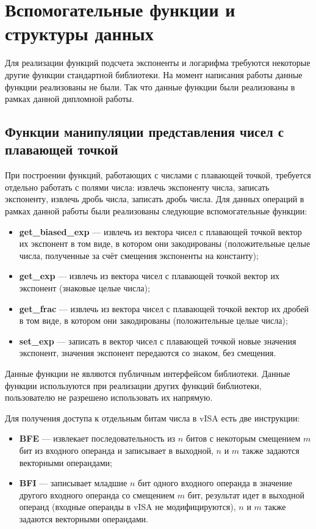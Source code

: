 

\chapter{Вспомогательные функции и структуры данных}

Для реализации функций подсчета экспоненты и логарифма требуются некоторые другие функции стандартной библиотеки.
На момент написания работы данные функции реализованы не были.
Так что данные функции были реализованы в рамках данной дипломной работы.

\section{Функции манипуляции представления чисел с плавающей точкой}

При построении функций, работающих с числами с плавающей точкой, требуется отдельно работать с полями числа: извлечь экспоненту числа, записать экспоненту, извлечь дробь числа, записать дробь числа.
Для данных операций в рамках данной работы были реализованы следующие вспомогательные функции:

\begin{itemize}
    \item \textbf{get\_biased\_exp} --- извлечь из вектора чисел с плавающей точкой вектор их экспонент в том виде, в котором они закодированы (положительные целые числа, полученные за счёт смещения экспоненты на константу);
    \item \textbf{get\_exp} --- извлечь из вектора чисел с плавающей точкой вектор их экспонент (знаковые целые числа);
    \item \textbf{get\_frac} --- извлечь из вектора чисел с плавающей точкой вектор их дробей в том виде, в котором они закодированы (положительные целые числа);
    \item \textbf{set\_exp} --- записать в вектор чисел с плавающей точкой новые значения экспонент, значения экспонент передаются со знаком, без смещения.
\end{itemize}

Данные функции не являются публичным интерфейсом библиотеки.
Данные функции используются при реализации других функций библиотеки, пользователю не разрешено использовать их напрямую.

Для получения доступа к отдельным битам числа в vISA есть две инструкции:

\begin{itemize}
    \item \textbf{BFE} --- извлекает последовательность из $n$ битов с некоторым смещением $m$ бит из входного операнда и записывает в выходной, $n$ и $m$ также задаются векторными операндами;
    \item \textbf{BFI} --- записывает младшие $n$ бит одного входного операнда в значение другого входного операнда со смещением $m$ бит, результат идет в выходной операнд (входные операнды в vISA не модифицируются), $n$ и $m$ также задаются векторными операндами.
\end{itemize}

